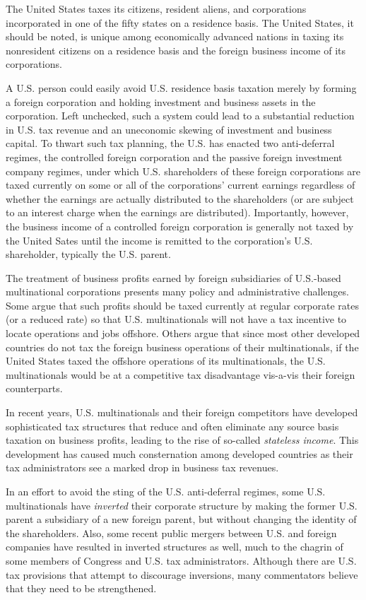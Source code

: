 The United States taxes its citizens, resident aliens, and corporations incorporated in one of the fifty states on a residence basis.  The United States, it should be noted, is unique among economically advanced nations in taxing its nonresident citizens on a residence basis and the foreign business income of its corporations. 

A U.S. person could easily avoid U.S. residence basis taxation merely by forming a foreign corporation and holding investment and business assets in the corporation.  Left unchecked, such a system could lead to a substantial reduction in U.S. tax revenue and an uneconomic skewing of investment and business capital.  To thwart such tax planning, the U.S. has enacted two anti-deferral regimes, the controlled foreign corporation and the passive foreign investment company regimes, under which U.S. shareholders of these foreign corporations are taxed currently on some or all of the corporations' current earnings regardless of whether the earnings are actually distributed to the shareholders (or are subject to an interest charge when the earnings are distributed).  Importantly, however, the business income of a controlled foreign corporation is generally not taxed by the United Sates until the income is remitted to the corporation's U.S. shareholder, typically the U.S. parent.  

The treatment of business profits earned by foreign subsidiaries of U.S.-based multinational corporations presents many policy and administrative challenges.  Some argue that such profits should be taxed currently at regular corporate rates (or a reduced rate) so that U.S. multinationals will not have a tax incentive to locate operations and jobs offshore.  Others argue that since most other developed countries do not tax the foreign business operations of their multinationals, if the United States taxed the offshore operations of its multinationals, the U.S. multinationals would be at a competitive tax disadvantage vis-a-vis their foreign counterparts.  

In recent years, U.S. multinationals and their foreign competitors have developed sophisticated tax structures that reduce and often eliminate any source basis taxation on business profits, leading to the rise of so-called \emph{stateless income}.  This development has caused much consternation among developed countries as their tax administrators see a marked drop in business tax revenues.  

In an effort to avoid the sting of the U.S. anti-deferral regimes, some U.S. multinationals have  \textit{inverted} their corporate structure by making the former U.S. parent a subsidiary of a new foreign parent, but without changing the identity of the shareholders.  Also, some recent public mergers between U.S. and foreign companies have resulted in inverted structures as well, much to the chagrin of some members of Congress and U.S. tax administrators.  Although there are U.S. tax provisions that attempt to discourage inversions, many commentators believe that they need to be strengthened.       

